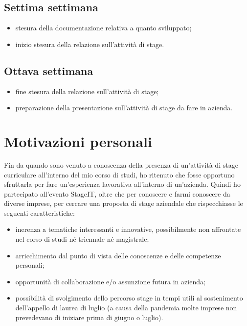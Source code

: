 \subsection{Settima settimana} 
\begin{itemize}
	\item stesura della documentazione relativa a quanto sviluppato;
	\item inizio stesura della relazione sull'attività di stage.
\end{itemize}

\subsection{Ottava settimana} 
\begin{itemize}
	\item fine stesura della relazione sull'attività di stage;
	\item preparazione della presentazione sull'attività di stage da fare in azienda.
\end{itemize}

\section{Motivazioni personali}

Fin da quando sono venuto a conoscenza della presenza di un'attività di stage curriculare all'interno del mio corso di studi, ho ritenuto che fosse opportuno sfruttarla per fare un'esperienza lavorativa all'interno di un'azienda. Quindi ho partecipato all'evento StageIT, oltre che per conoscere e farmi conoscere da diverse imprese, per cercare una proposta di stage aziendale che rispecchiasse le seguenti caratteristiche:

\begin{itemize}
	\item inerenza a tematiche interessanti e innovative, possibilmente non affrontate nel corso di studi né triennale né magistrale;
	\item arricchimento dal punto di vista delle conoscenze e delle competenze personali;
	\item opportunità di collaborazione e/o assunzione futura in azienda;
	\item possibilità di svolgimento dello percorso stage in tempi utili al sostenimento dell'appello di laurea di luglio (a causa della pandemia molte imprese non prevedevano di iniziare prima di giugno o luglio).
\end{itemize}

